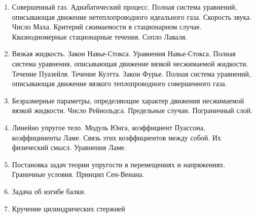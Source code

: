 \documentclass[specialist, subf, href, colorlinks=true, 14pt, times, mtpro, final]{report}
\theoremstyle{definition}
\begin{document}
\begin{enumerate}
\item Совершенный газ. Адиабатический процесс. Полная система уравнений, описывающая движение нетеплопроводного идеального газа. Скорость звука. Число Маха. Критерий сжимаемости в стационарном случае. Квазиодномерные стационарные течения. Сопло Лаваля.
\item Вязкая жидкость. Закон Навье-Стокса. Уравнения Навье-Стокса. Полная система уравнения, описывающая движение вязкой несжимаемой жидкости. Течение Пуазейля. Течение Куэтта. Закон Фурье. Полная система уравнений, описывающая движение вязкого теплопроводного совершенного газа.
\item Безразмерные параметры, определяющие характер движения несжимаемой вязкой жидкости. Число Рейнольдса. Предельные случаи. Пограничный слой.
\item Линейно упругое тело. Модуль Юнга, коэффициент Пуассона, коэффициненты Ламе. Связь этих коэффициентов между собой. Их физический смысл. Уравнения Ламе.
\item Постановка задач теории упругости в перемещениях и напряжениях. Граничные условия. Принцип Сен-Венана.
\item Задача об изгибе балки.
\item Кручение цилиндрических стержней
	\end{enumerate}
\end{document}
